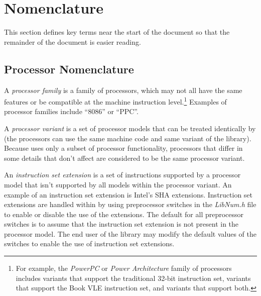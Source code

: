 \section{Nomenclature}
\label{ciov0:snom0}

This section defines key terms near the start of the 
document so that the remainder of the document is easier 
reading.  


\subsection{Processor Nomenclature}
\label{ciov0:snom0:sptr0}

A \emph{processor family} is a 
family of processors, which may not all have the same 
features or be compatible at the machine instruction 
level.\footnote{For example, the \emph{PowerPC} or 
\emph{Power Architecture} family of processors includes 
variants that support the traditional 32-bit instruction 
set, variants that support the Book VLE instruction set, and 
variants that support both.} Examples of processor families 
include ``8086'' or ``PPC''.  

A \emph{processor variant} is a set 
of processor models that can be treated identically by 
\emph{\productbasenameshort{}} (the processors can use the 
same machine code and same variant of the 
\emph{\productbasenameshort{}} library).  Because 
\emph{\productbasenameshort{}} uses only a subset of 
processor functionality, processors that differ in some 
details that don't affect \emph{\productbasenameshort{}} are 
considered to be the same processor variant.  

An \emph{instruction set 
extension} is a set of instructions supported by a processor 
model that isn't supported by all models within the 
processor variant.  An example of an instruction set 
extension is Intel's SHA extensions.  Instruction set 
extensions are handled within \emph{\productbasenameshort{}} 
by using preprocessor switches in the \emph{LibNum.h} file 
to enable or disable the use of the extensions.  The default
for all preprocessor switches is to assume that the 
instruction set extension is not present in the processor 
model.  The end user of the library may modify the default 
values of the switches to enable the use of instruction set 
extensions.

